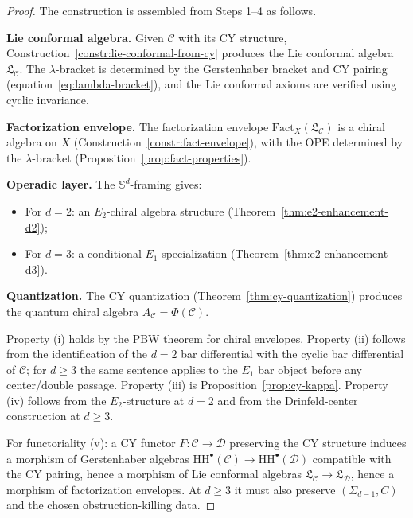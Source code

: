 \documentclass[11pt]{article}
\theoremstyle{plain}
\theoremstyle{definition}
\theoremstyle{remark}
\newcommand{\Eone}{E_1}
\newcommand{\Etwo}{E_2}
\newcommand{\HH}{\mathrm{HH}}
\newcommand{\Sd}{\mathbb{S}^d}
\newcommand{\Fact}{\mathrm{Fact}}
\newcommand{\cC}{\mathcal{C}}
\newcommand{\cD}{\mathcal{D}}
\newcommand{\frakL}{\mathfrak{L}}
\begin{document}
\begin{proof}[Proof]
The construction is assembled from Steps 1--4 as follows.

\smallskip\noindent\textbf{Lie conformal algebra.}\; Given $\cC$ with
its CY structure, Construction~\ref{constr:lie-conformal-from-cy}
produces the Lie conformal algebra $\frakL_\cC$. The $\lambda$-bracket
is determined by the Gerstenhaber bracket and CY pairing
(equation~\eqref{eq:lambda-bracket}), and the Lie conformal axioms are
verified using cyclic invariance.

\smallskip\noindent\textbf{Factorization envelope.}\; The
factorization envelope $\Fact_X(\frakL_\cC)$ is a chiral algebra on $X$
(Construction~\ref{constr:fact-envelope}), with the OPE determined by
the $\lambda$-bracket (Proposition~\ref{prop:fact-properties}).

\smallskip\noindent\textbf{Operadic layer.}\; The $\Sd$-framing gives:
\begin{itemize}
\item For $d = 2$: an $\Etwo$-chiral algebra structure (Theorem~\ref{thm:e2-enhancement-d2});
\item For $d = 3$: a conditional $\Eone$ specialization
(Theorem~\ref{thm:e2-enhancement-d3}).
\end{itemize}

\smallskip\noindent\textbf{Quantization.}\; The CY quantization
(Theorem~\ref{thm:cy-quantization}) produces the quantum chiral algebra
$A_\cC = \Phi(\cC)$.

\smallskip\noindent
Property (i) holds by the PBW theorem for chiral envelopes. Property
(ii) follows from the identification of the $d=2$ bar differential with
the cyclic bar differential of $\cC$; for $d \geq 3$ the same sentence
applies to the $\Eone$ bar object before any center/double passage.
Property (iii) is Proposition~\ref{prop:cy-kappa}. Property (iv)
follows from the $\Etwo$-structure at $d=2$ and from the Drinfeld-center
construction at $d \geq 3$.

For functoriality (v): a CY functor $F \colon \cC \to \cD$ preserving
the CY structure induces a morphism of Gerstenhaber algebras
$\HH^\bullet(\cC) \to \HH^\bullet(\cD)$ compatible with the CY pairing,
hence a morphism of Lie conformal algebras
$\frakL_\cC \to \frakL_\cD$, hence a morphism of factorization
envelopes. At $d \geq 3$ it must also preserve
$(\Sigma_{d-1},C)$ and the chosen obstruction-killing data.
\end{proof}


\end{document}
